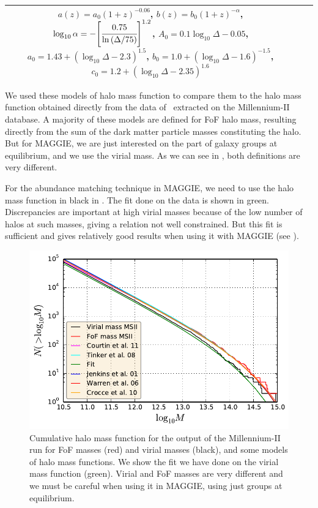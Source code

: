 \begin{table}[htb]
\begin{tabular}{cp{6.5cm}p{5cm}}
        $a\left(z\right)=a_0{\left(1+z\right)}^{-0.06}$,\newline
        $b\left(z\right)=b_0{\left(1+z\right)}^{-\alpha}$,\newline
        $\log_{10}\alpha=
        -{\left[\cfrac{0.75}{\ln\left(\Delta/75\right)}\right]}^{1.2}$,\newline
        $A_0=0.1\log_{10}\Delta-0.05$,\newline
        $a_0=1.43+{\left(\log_{10}\Delta-2.3\right)}^{1.5}$,\newline
        $b_0=1.0+{\left(\log_{10}\Delta-1.6\right)}^{-1.5}$,\newline
        $c_0=1.2+{\left(\log_{10}\Delta-2.35\right)}^{1.6}$ \\
        \bottomrule
    \end{tabular}
\end{table}

We used these models of halo mass function to compare them to the halo mass
function obtained directly from the data of~\cite{BoylanKolchin+09} extracted
on the Millennium-II database. A majority of these models are defined for FoF
halo mass, resulting directly from the sum of the dark matter particle masses
constituting the halo. But for MAGGIE, we are just interested on the part of
galaxy groups at equilibrium, and we use the virial mass. As we can see in
, both definitions are very different.

For the abundance matching technique in MAGGIE, we need to use the halo mass
function in black in . The fit done on the data is shown in
green. Discrepancies are important at high virial masses because of the low
number of halos at such masses, giving a relation not well constrained. But
this fit is sufficient and gives relatively good results when using it with
MAGGIE (see ).
%
\begin{figure}[htb]
    \centering
    \includegraphics[width=0.6\linewidth]{figures/hmf/hmf.pdf}
    \caption{Cumulative halo mass function for the output of the Millennium-II
        run for FoF masses (red) and virial masses (black), and some models of
        halo mass functions. We show the fit we have done on the virial mass
        function (green). Virial and FoF masses are very different and we must
        be careful when using it in MAGGIE, using just groups at
    equilibrium.\label{fig:hmf}}
\end{figure}

